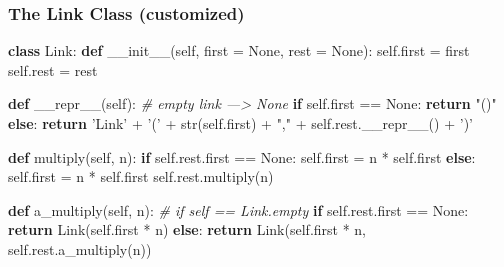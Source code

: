 \documentclass[11pt]{article}
\newenvironment{Shaded}{}{}
\newcommand{\KeywordTok}[1]{\textcolor[rgb]{0.00,0.44,0.13}{\textbf{{#1}}}}
\newcommand{\StringTok}[1]{\textcolor[rgb]{0.25,0.44,0.63}{{#1}}}
\newcommand{\CommentTok}[1]{\textcolor[rgb]{0.38,0.63,0.69}{\textit{{#1}}}}
\newcommand{\FunctionTok}[1]{\textcolor[rgb]{0.02,0.16,0.49}{{#1}}}
\newcommand{\NormalTok}[1]{{#1}}
\newcommand{\VariableTok}[1]{\textcolor[rgb]{0.10,0.09,0.49}{{#1}}}
\newcommand{\ControlFlowTok}[1]{\textcolor[rgb]{0.00,0.44,0.13}{\textbf{{#1}}}}
\newcommand{\OperatorTok}[1]{\textcolor[rgb]{0.40,0.40,0.40}{{#1}}}
\newcommand{\BuiltInTok}[1]{{#1}}
\begin{document}
\subsubsection{The Link Class
(customized)}\label{the-link-class-customized}

\begin{Shaded}
\begin{Highlighting}[]
\KeywordTok{class}\NormalTok{ Link:}
    \KeywordTok{def} \FunctionTok{__init__}\NormalTok{(}\VariableTok{self}\NormalTok{, first }\OperatorTok{=} \VariableTok{None}\NormalTok{, rest }\OperatorTok{=} \VariableTok{None}\NormalTok{):}
        \VariableTok{self}\NormalTok{.first }\OperatorTok{=}\NormalTok{ first}
        \VariableTok{self}\NormalTok{.rest }\OperatorTok{=}\NormalTok{ rest}
        
    \KeywordTok{def} \FunctionTok{__repr__}\NormalTok{(}\VariableTok{self}\NormalTok{):}
        \CommentTok{# empty link ---> None }
        \ControlFlowTok{if} \VariableTok{self}\NormalTok{.first }\OperatorTok{==} \VariableTok{None}\NormalTok{:}
            \ControlFlowTok{return} \StringTok{"()"}
        \ControlFlowTok{else}\NormalTok{:}
            \ControlFlowTok{return} \StringTok{'Link'} \OperatorTok{+} \StringTok{'('} \OperatorTok{+} \BuiltInTok{str}\NormalTok{(}\VariableTok{self}\NormalTok{.first) }\OperatorTok{+} \StringTok{","} \OperatorTok{+} \VariableTok{self}\NormalTok{.rest.}\FunctionTok{__repr__}\NormalTok{() }\OperatorTok{+} \StringTok{')'}
            
    \KeywordTok{def}\NormalTok{ multiply(}\VariableTok{self}\NormalTok{, n):}
        \ControlFlowTok{if} \VariableTok{self}\NormalTok{.rest.first }\OperatorTok{==} \VariableTok{None}\NormalTok{:}
            \VariableTok{self}\NormalTok{.first }\OperatorTok{=}\NormalTok{ n }\OperatorTok{*} \VariableTok{self}\NormalTok{.first}
        \ControlFlowTok{else}\NormalTok{:}
            \VariableTok{self}\NormalTok{.first }\OperatorTok{=}\NormalTok{ n }\OperatorTok{*} \VariableTok{self}\NormalTok{.first}
            \VariableTok{self}\NormalTok{.rest.multiply(n)}
            
    \KeywordTok{def}\NormalTok{ a_multiply(}\VariableTok{self}\NormalTok{, n):}
        \CommentTok{# if self == Link.empty}
        \ControlFlowTok{if} \VariableTok{self}\NormalTok{.rest.first }\OperatorTok{==} \VariableTok{None}\NormalTok{:}
            \ControlFlowTok{return}\NormalTok{ Link(}\VariableTok{self}\NormalTok{.first }\OperatorTok{*}\NormalTok{ n)}
        \ControlFlowTok{else}\NormalTok{:}
            \ControlFlowTok{return}\NormalTok{ Link(}\VariableTok{self}\NormalTok{.first }\OperatorTok{*}\NormalTok{ n, }\VariableTok{self}\NormalTok{.rest.a_multiply(n))}
            

\end{Highlighting}
\end{Shaded}
\end{document}
